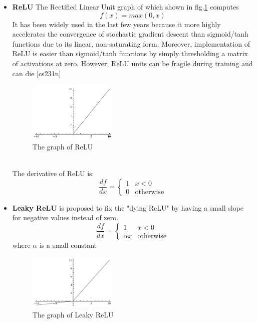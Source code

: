 \begin{itemize}
    \item \textbf{ReLU} The Rectified Linear Unit graph of which shown in fig.\ref{fig:relu} computes 
    \begin{equation}
        f(x) = max(0,x)
    \end{equation}
    It has been widely used in the last few years because it more highly accelerates the convergence of stochastic gradient descent than sigmoid/tanh functions due to its linear, non-saturating form. Moreover, implementation of ReLU is easier than sigmoid/tanh functions by simply thresholding a matrix of activations at zero. However, ReLU units can be fragile during training and can die [cs231n]
    \begin{figure}[th!]
        \centering
        \includegraphics[width=0.4\textwidth]{Chapters/Fig/relu.jpg}
        \caption{The graph of ReLU}
        \label{fig:relu}
    \end{figure}\\
    The derivative of ReLU is:
    \begin{equation}
        \frac{df}{dx} = \begin{cases}
            1 & x < 0\\
            0 & \mbox{otherwise}
        \end{cases}
    \end{equation}
    \item \textbf{Leaky ReLU} is proposed to fix the "dying ReLU" by having a small slope for negative values instead of zero.
        \begin{equation}
        \frac{df}{dx} = \begin{cases}
            1 & x < 0\\
            \alpha x & \mbox{otherwise}
        \end{cases}
    \end{equation}
    where $\alpha$ is a small constant
    \begin{figure}[h!]
        \centering
        \includegraphics[width=0.4\textwidth]{Chapters/Fig/leaky.jpeg}
        \caption{The graph of Leaky ReLU}
        \label{fig:lrelu}
    \end{figure}
\end{itemize}

